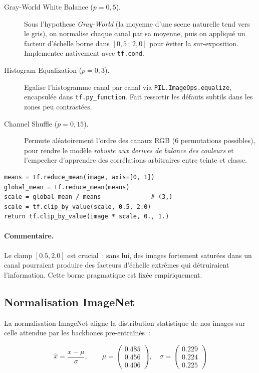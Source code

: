 \documentclass[12pt,a4paper,openany]{report}
\begin{document}
\begin{description}
    \item[Gray-World White Balance ($p=0{,}5$).] Sous l'hypothese \emph{Gray-World} (la moyenne d'une scene naturelle tend vers le gris), on normalise chaque canal par sa moyenne, puis on appliqué un facteur d'échelle borne dans $[0{,}5\,;\,2{,}0]$ pour éviter la sur-exposition. Implementee nativement avec \texttt{tf.cond}.
    \item[Histogram Equalization ($p=0{,}3$).] Egalise l'histogramme canal par canal via \texttt{PIL.ImageOps.equalize}, encapsulée dans \texttt{tf.py\_function}. Fait ressortir les défauts subtils dans les zones peu contrastées.
    \item[Channel Shuffle ($p=0{,}15$).] Permute aléatoirement l'ordre des canaux RGB ($6$ permutations possibles), pour rendre le modèle \emph{robuste aux derives de balance des couleurs} et l'empecher d'apprendre des corrélations arbitraires entre teinte et classe.
\end{description}

\begin{lstlisting}[caption={Implementation du Gray-World White Balance.}]
means = tf.reduce_mean(image, axis=[0, 1])
global_mean = tf.reduce_mean(means)
scale = global_mean / means              # (3,)
scale = tf.clip_by_value(scale, 0.5, 2.0)
return tf.clip_by_value(image * scale, 0., 1.)
\end{lstlisting}

\paragraph{Commentaire.}
Le clamp $[0.5, 2.0]$ est crucial~: sans lui, des images fortement saturées dans un canal pourraient produire des facteurs d'échelle extrêmes qui détruiraient l'information. Cette borne pragmatique est fixée empiriquement.

\subsection{Normalisation ImageNet}

La normalisation ImageNet aligne la distribution statistique de nos images sur celle attendue par les backbones pre-entraînés~:

\begin{equation}
\hat{x} = \frac{x - \mu}{\sigma}, \qquad
\mu = \begin{pmatrix}0.485\\0.456\\0.406\end{pmatrix}, \quad
\sigma = \begin{pmatrix}0.229\\0.224\\0.225\end{pmatrix}
\label{eq:imagenet}
\end{equation}
\end{document}
